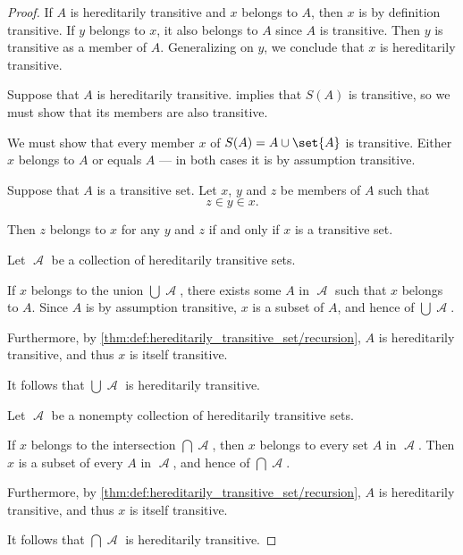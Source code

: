 \begin{proof}
   If \( A \) is hereditarily transitive and \( x \) belongs to \( A \), then \( x \) is by definition transitive. If \( y \) belongs to \( x \), it also belongs to \( A \) since \( A \) is transitive. Then \( y \) is transitive as a member of \( A \). Generalizing on \( y \), we conclude that \( x \) is hereditarily transitive.

   Suppose that \( A \) is hereditarily transitive.  implies that \( S(A) \) is transitive, so we must show that its members are also transitive.

  We must show that every member \( x \) of \( S(A) = A \cup \set{ A } \) is transitive. Either \( x \) belongs to \( A \) or equals \( A \) --- in both cases it is by assumption transitive.

   Suppose that \( A \) is a transitive set. Let \( x \), \( y \) and \( z \) be members of \( A \) such that
  \begin{equation*}
    z \in y \in x.
  \end{equation*}

  Then \( z \) belongs to \( x \) for any \( y \) and \( z \) if and only if \( x \) is a transitive set.

   Let \( \mscrA \) be a collection of hereditarily transitive sets.

  If \( x \) belongs to the union \( \bigcup \mscrA \), there exists some \( A \) in \( \mscrA \) such that \( x \) belongs to \( A \). Since \( A \) is by assumption transitive, \( x \) is a subset of \( A \), and hence of \( \bigcup \mscrA \).

  Furthermore, by \cref{thm:def:hereditarily_transitive_set/recursion}, \( A \) is hereditarily transitive, and thus \( x \) is itself transitive.

  It follows that \( \bigcup \mscrA \) is hereditarily transitive.

   Let \( \mscrA \) be a nonempty collection of hereditarily transitive sets.

  If \( x \) belongs to the intersection \( \bigcap \mscrA \), then \( x \) belongs to every set \( A \) in \( \mscrA \). Then \( x \) is a subset of every \( A \) in \( \mscrA \), and hence of \( \bigcap \mscrA \).

  Furthermore, by \cref{thm:def:hereditarily_transitive_set/recursion}, \( A \) is hereditarily transitive, and thus \( x \) is itself transitive.

  It follows that \( \bigcap \mscrA \) is hereditarily transitive.
\end{proof}

